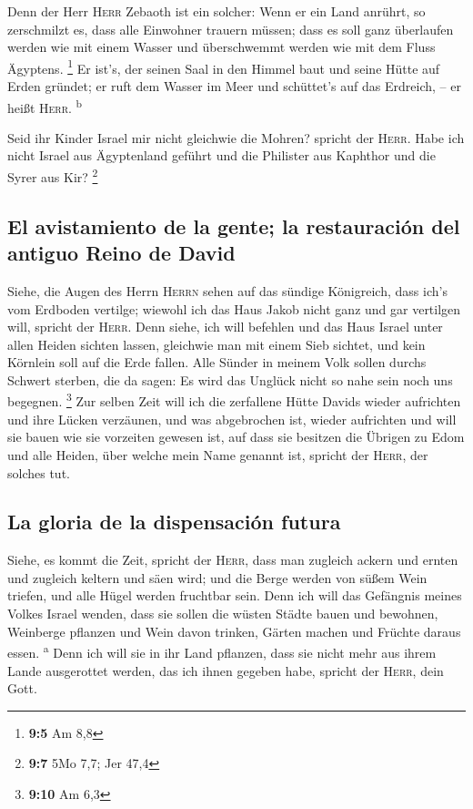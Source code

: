 Denn der Herr \textsc{Herr} Zebaoth ist ein solcher: Wenn
er ein Land anrührt, so zerschmilzt es, dass alle Einwohner trauern
müssen; dass es soll ganz überlaufen werden wie mit einem Wasser und
überschwemmt werden wie mit dem Fluss Ägyptens. \footnote{\textbf{9:5}
  Am 8,8}  Er ist's, der seinen Saal in den Himmel baut
und seine Hütte auf Erden gründet; er ruft dem Wasser im Meer und
schüttet's auf das Erdreich, -- er heißt \textsc{Herr}.
\textsuperscript{b}

 Seid ihr Kinder Israel mir nicht gleichwie die Mohren?
spricht der \textsc{Herr}. Habe ich nicht Israel aus Ägyptenland geführt
und die Philister aus Kaphthor und die Syrer aus Kir? \footnote{\textbf{9:7}
  5Mo 7,7; Jer 47,4}

\hypertarget{el-avistamiento-de-la-gente-la-restauraciuxf3n-del-antiguo-reino-de-david}{%
\subsection{El avistamiento de la gente; la restauración del antiguo
Reino de
David}\label{el-avistamiento-de-la-gente-la-restauraciuxf3n-del-antiguo-reino-de-david}}

 Siehe, die Augen des Herrn \textsc{Herrn} sehen auf das
sündige Königreich, dass ich's vom Erdboden vertilge; wiewohl ich das
Haus Jakob nicht ganz und gar vertilgen will, spricht der \textsc{Herr}.
 Denn siehe, ich will befehlen und das Haus Israel unter
allen Heiden sichten lassen, gleichwie man mit einem Sieb sichtet, und
kein Körnlein soll auf die Erde fallen.  Alle Sünder in
meinem Volk sollen durchs Schwert sterben, die da sagen: Es wird das
Unglück nicht so nahe sein noch uns begegnen. \footnote{\textbf{9:10} Am
  6,3}  Zur selben Zeit will ich die zerfallene Hütte
Davids wieder aufrichten und ihre Lücken verzäunen, und was abgebrochen
ist, wieder aufrichten und will sie bauen wie sie vorzeiten gewesen ist,
 auf dass sie besitzen die Übrigen zu Edom und alle
Heiden, über welche mein Name genannt ist, spricht der \textsc{Herr},
der solches tut.

\hypertarget{la-gloria-de-la-dispensaciuxf3n-futura}{%
\subsection{La gloria de la dispensación
futura}\label{la-gloria-de-la-dispensaciuxf3n-futura}}

 Siehe, es kommt die Zeit, spricht der \textsc{Herr},
dass man zugleich ackern und ernten und zugleich keltern und säen wird;
und die Berge werden von süßem Wein triefen, und alle Hügel werden
fruchtbar sein.  Denn ich will das Gefängnis meines
Volkes Israel wenden, dass sie sollen die wüsten Städte bauen und
bewohnen, Weinberge pflanzen und Wein davon trinken, Gärten machen und
Früchte daraus essen. \textsuperscript{a}  Denn ich will
sie in ihr Land pflanzen, dass sie nicht mehr aus ihrem Lande
ausgerottet werden, das ich ihnen gegeben habe, spricht der
\textsc{Herr}, dein Gott.
